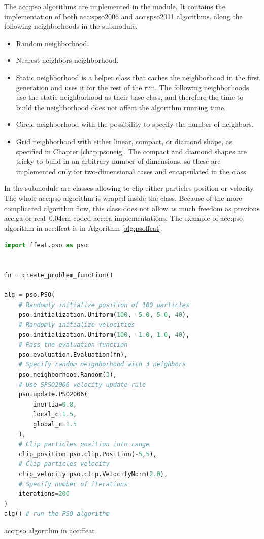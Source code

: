 The \acrlong{acc:pso} algorithms are implemented in the  module. It contains the implementation of both \acrshort{acc:spso2006} and \acrshort{acc:spso2011} algorithms, along the following neighborhoods in the  submodule.
\begin{itemize}
    \item Random neighborhood.
    \item Nearest neighbors neighborhood.
    \item Static neighborhood is a helper class that caches the neighborhood in the first generation and uses it for the rest of the run. The following neighborhoods use the static neighborhood as their base class, and therefore the time to build the neighborhood does not affect the algorithm running time.
    \item Circle neighborhood with the possibility to specify the number of neighbors.
    \item Grid neighborhood with either linear, compact, or diamond shape, as specified in Chapter \ref{chap:psoneig}. The compact and diamond shapes are tricky to build in an arbitrary number of dimensions, so these are implemented only for two-dimensional cases and encapsulated in the  class.
\end{itemize}

In the  submodule are classes allowing to clip either particles position or velocity. The whole \acrshort{acc:pso} algorithm is wraped inside the  class. Because of the more complicated algorithm flow, this class does not allow as much freedom as previous \acrshort{acc:ga} or real--\kern0.04em coded \acrshort{acc:ea} implementations. The example of \acrshort{acc:pso} algorithm in \acrshort{acc:ffeat} is in Algorithm \ref{alg:psoffeat}.

\begin{algorithm}[b!]
\begin{lstlisting}[language=Python, xrightmargin=18pt]
import ffeat.pso as pso


fn = create_problem_function()

alg = pso.PSO(
    # Randomly initialize position of 100 particles
    pso.initialization.Uniform(100, -5.0, 5.0, 40),
    # Randomly initialize velocities
    pso.initialization.Uniform(100, -1.0, 1.0, 40),
    # Pass the evaluation function
    pso.evaluation.Evaluation(fn),
    # Specify random neighborhood with 3 neighbors
    pso.neighborhood.Random(3),
    # Use SPSO2006 velocity update rule
    pso.update.PSO2006(
        inertia=0.8, 
        local_c=1.5, 
        global_c=1.5
    ),
    # Clip particles position into range
    clip_position=pso.clip.Position(-5,5),
    # Clip particles velocity
    clip_velocity=pso.clip.VelocityNorm(2.0),
    # Specify number of iterations
    iterations=200
)
alg() # run the PSO algorithm
\end{lstlisting}
\caption{\acrshort*{acc:pso} algorithm in \acrshort*{acc:ffeat}}
\label{alg:psoffeat}
\end{algorithm}
